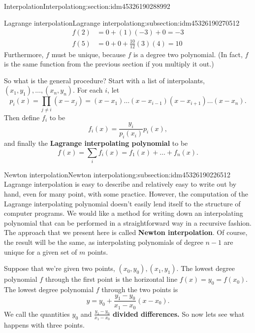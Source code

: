 \documentclass[oneside,10pt,]{article}
\newcommand{\terminology}[1]{\textbf{#1}}
\numberwithin{equation}{section}
\numberwithin{equation}{section}
\newcommand{\amp}{&}
\begin{document}
\begin{sectionptx}{Interpolation}{}{Interpolation}{}{}{g:section:idm45326190288992}
\begin{subsectionptx}{Lagrange interpolation}{}{Lagrange interpolation}{}{}{g:subsection:idm45326190270512}
\begin{align*}
f(2) \amp= 0 + (1)(-3) + 0 = -3\\
f(5) \amp= 0 + 0 + \frac{10}{12}(3)(4) = 10
\end{align*}
Furthermore, \(f\) must be unique, because \(f\) is a degree two polynomial. (In fact, \(f\) is the same function from the previous section if you multiply it out.)%
\par
So what is the general procedure? Start with a list of interpolants, \((x_1, y_1), \ldots, (x_n, y_n)\). For each \(i\), let%
\begin{equation*}
p_i(x) = \prod_{j\neq i} (x - x_j) = (x - x_1)\ldots(x - x_{i-1})(x-x_{i+1})\ldots(x - x_n).
\end{equation*}
Then define \(f_i\) to be%
\begin{equation*}
f_i(x) = \frac{y_i}{p_i(x_i)} p_i(x),
\end{equation*}
and finally the \terminology{Lagrange interpolating polynomial} to be%
\begin{equation*}
f(x) = \sum_i f_i(x) = f_1(x) + \ldots + f_n(x).
\end{equation*}
%
\end{subsectionptx}
%
%
\typeout{************************************************}
\typeout{************************************************}
%
\begin{subsectionptx}{Newton interpolation}{}{Newton interpolation}{}{}{g:subsection:idm45326190226512}
Lagrange interpolation is easy to describe and relatively easy to write out by hand, even for many point, with some practice. However, the computation of the Lagrange interpolating polynomial doesn't easily lend itself to the structure of computer programs. We would like a method for writing down an interpolating polynomial that can be performed in a straightforward way in a recursive fashion. The approach that we present here is called \terminology{Newton interpolation}. Of course, the result will be the same, as interpolating polynomials of degree \(n-1\) are unique for a given set of \(m\) points.%
\par
Suppose that we're given two points, \((x_0, y_0), (x_1, y_1)\). The lowest degree polynomial \(f\) through the first point is the horizontal line \(f(x) = y_0 = f(x_0)\). The lowest degree polynomial \(f\) through the two points is%
\begin{equation*}
y = y_0 + \frac{y_1 - y_0}{x_1 - x_0}(x - x_0).
\end{equation*}
We call the quantities \(y_0\) and \(\frac{y_1 - y_0}{x_1 - x_0}\) \terminology{divided differences.} So now lets see what happens with three points.%

\end{subsectionptx}
\end{sectionptx}
\end{document}
